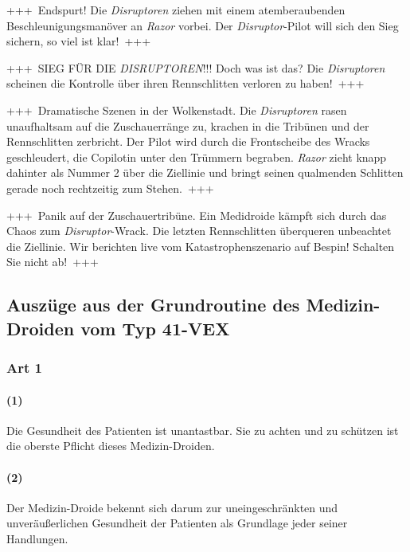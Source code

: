 \documentclass[]{multiversum}
\begin{document}
+++~Endspurt!
    Die \textit{Disruptoren} ziehen mit einem atemberaubenden Beschleunigungsmanöver an \textit{Razor} vorbei.
    Der \textit{Disruptor}-Pilot will sich den Sieg sichern, so viel ist klar!~+++

+++~SIEG FÜR DIE \textit{DISRUPTOREN}!!!
    Doch was ist das?
    Die \textit{Disruptoren} scheinen die Kontrolle über ihren Rennschlitten verloren zu haben!~+++

+++~Dramatische Szenen in der Wolkenstadt.
    Die \textit{Disruptoren} rasen unaufhaltsam auf die Zuschauerränge zu, krachen in die Tribünen und der Rennschlitten zerbricht.
    Der Pilot wird durch die Frontscheibe des Wracks geschleudert, die Copilotin unter den Trümmern begraben.
    \textit{Razor} zieht knapp dahinter als Nummer 2 über die Ziellinie und bringt seinen qualmenden Schlitten gerade noch rechtzeitig zum Stehen.~+++

+++~Panik auf der Zuschauertribüne.
    Ein Medidroide kämpft sich durch das Chaos zum \textit{Disruptor}-Wrack.
    Die letzten Rennschlitten überqueren unbeachtet die Ziellinie.
    Wir berichten live vom Katastrophenszenario auf Bespin! Schalten Sie nicht ab!~+++

\setlength{\parskip}{0pt}
\setbeforeparaskip{0pt}
\setparaheadstyle{}
\setsubsubsecheadstyle{\centering\bfseries}

\subsection{Auszüge aus der Grundroutine des Medizin-Droiden vom Typ 41-VEX}

\subsubsection{Art 1}
\paragraph{(1)} Die Gesundheit des Patienten ist unantastbar. Sie zu achten und zu schützen ist die oberste Pflicht dieses Medizin-Droiden.
\paragraph{(2)} Der Medizin-Droide bekennt sich darum zur uneingeschränkten und unveräußerlichen Gesundheit der Patienten als Grundlage jeder seiner Handlungen.
\end{document}
